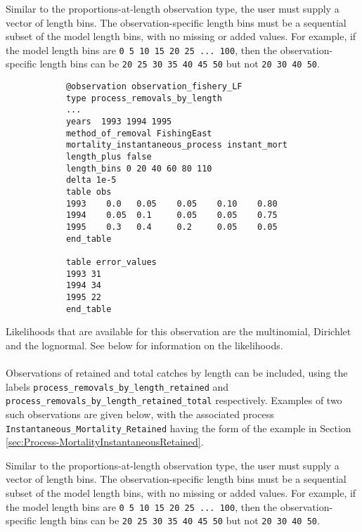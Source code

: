 \begin{itemize}
	Similar to the proportions-at-length observation type, the user must supply a vector of length bins. The observation-specific length bins must be a sequential subset of the model length bins, with no missing or added values. For example, if the model length bins are \texttt{0 5 10 15 20 25 ... 100}, then the observation-specific length bins can be \texttt{20 25 30 35 40 45 50} but not \texttt{20 30 40 50}.
	
	{\small{\begin{verbatim}
			@observation observation_fishery_LF
			type process_removals_by_length
			...
			years  1993 1994 1995
			method_of_removal FishingEast
			mortality_instantaneous_process instant_mort
			length_plus false
			length_bins 0 20 40 60 80 110
			delta 1e-5
			table obs
			1993    0.0   0.05    0.05    0.10    0.80
			1994    0.05  0.1     0.05    0.05    0.75
			1995    0.3   0.4     0.2     0.05    0.05
			end_table
			
			table error_values
			1993 31
			1994 34
			1995 22
			end_table
			\end{verbatim}}}
	
	Likelihoods that are available for this observation are the multinomial, Dirichlet and the lognormal. See below for information on the likelihoods.
	
	\paragraph*{}\label{sec:Observation-ProcessRemovalsByLengthRetained}\label{sec:Observation-ProcessRemovalsByLengthRetainedTotal}
	
	Observations of retained and total catches by length can be included, using the labels \texttt{process\_removals\_by\_length\_retained} and \texttt{process\_removals\_by\_length\_retained\_total} respectively. Examples of two such observations are given below, with the associated process \texttt{Instantaneous\_Mortality\_Retained} having the form of the example in Section \ref{sec:Process-MortalityInstantaneousRetained}.
	
	Similar to the proportions-at-length observation type, the user must supply a vector of length bins. The observation-specific length bins must be a sequential subset of the model length bins, with no missing or added values. For example, if the model length bins are \texttt{0 5 10 15 20 25 ... 100}, then the observation-specific length bins can be \texttt{20 25 30 35 40 45 50} but not \texttt{20 30 40 50}.
	

\end{itemize}

